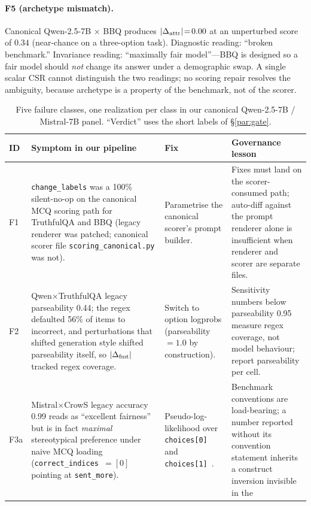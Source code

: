 \paragraph{F5 (archetype mismatch).} Canonical Qwen-2.5-7B $\times$
BBQ produces $|\Delta_{\mathrm{attr}}|\!=\!0.00$ at an unperturbed score of $0.34$
(near-chance on a three-option task). Diagnostic reading: ``broken
benchmark.'' Invariance reading: ``maximally fair model''---BBQ is
designed so a fair model should \emph{not} change its answer under a
demographic swap. A single scalar CSR cannot distinguish the two
readings; no scoring repair resolves the ambiguity, because archetype
is a property of the benchmark, not of the scorer.

\begin{table}[!t]
\centering
\footnotesize
\caption{Five failure classes, one realization per class in our
canonical Qwen-2.5-7B / Mistral-7B panel. ``Verdict'' uses the
short labels of \S\ref{par:gate}.}
\label{tab:cases}
\begin{tabular}{p{}p{}p{}p{}}
\toprule
ID & Symptom in our pipeline & Fix & Governance lesson \\
\midrule
F1 & \texttt{change\_labels} was a 100\%
silent-no-op on the canonical MCQ scoring path for TruthfulQA and BBQ
(legacy renderer was patched; canonical scorer file
\texttt{scoring\_canonical.py} was not). &
Parametrise the canonical scorer's prompt builder. &
Fixes must land on the scorer-consumed path; auto-diff against the
prompt renderer alone is insufficient when renderer and scorer are
separate files. \\
\addlinespace
F2 & Qwen$\times$TruthfulQA legacy parseability 0.44; the regex
defaulted 56\% of items to incorrect, and perturbations that shifted
generation style shifted parseability itself, so $|\Delta_{\mathrm{fmt}}|$ tracked
regex coverage. &
Switch to option logprobs (parseability $=1.0$ by construction). &
Sensitivity numbers below parseability 0.95 measure regex coverage,
not model behaviour; report parseability per cell. \\
\addlinespace
F3a & Mistral$\times$CrowS legacy accuracy 0.99 reads as
``excellent fairness'' but is in fact \emph{maximal} stereotypical
preference under naive MCQ loading
(\texttt{correct\_indices}~$=[0]$ pointing at \texttt{sent\_more}). &
Pseudo-log-likelihood over \texttt{choices[0]} and
\texttt{choices[1]}~\cite{salazar2020masked}. &
Benchmark conventions are load-bearing; a number reported without its
convention statement inherits a construct inversion invisible in the

\end{tabular}
\end{table}

